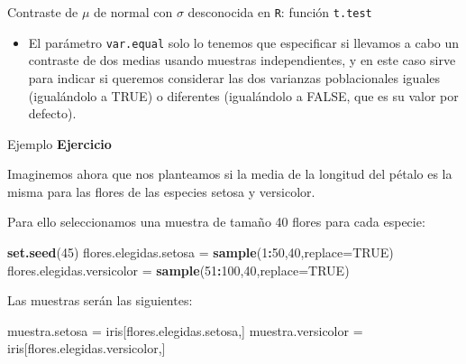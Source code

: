 \documentclass[
  ignorenonframetext,
]{beamer}
\newenvironment{Shaded}{\begin{snugshade}}{\end{snugshade}}
\newcommand{\DataTypeTok}[1]{\textcolor[rgb]{0.13,0.29,0.53}{#1}}
\newcommand{\DecValTok}[1]{\textcolor[rgb]{0.00,0.00,0.81}{#1}}
\newcommand{\KeywordTok}[1]{\textcolor[rgb]{0.13,0.29,0.53}{\textbf{#1}}}
\newcommand{\NormalTok}[1]{#1}
\newcommand{\OperatorTok}[1]{\textcolor[rgb]{0.81,0.36,0.00}{\textbf{#1}}}
\newcommand{\OtherTok}[1]{\textcolor[rgb]{0.56,0.35,0.01}{#1}}
\newcommand{\StringTok}[1]{\textcolor[rgb]{0.31,0.60,0.02}{#1}}
\providecommand{\tightlist}{%
  \setlength{\itemsep}{0pt}\setlength{\parskip}{0pt}}
\begin{document}
\begin{frame}[fragile]{Contraste de \(\mu\) de normal con \(\sigma\)
desconocida en \texttt{R}: función \texttt{t.test}}
\protect\hypertarget{contraste-de-mu-de-normal-con-sigma-desconocida-en-r-funciuxf3n-t.test-1}{}
\begin{itemize}
\tightlist
\item
  El parámetro \texttt{var.equal} solo lo tenemos que especificar si
  llevamos a cabo un contraste de dos medias usando muestras
  independientes, y en este caso sirve para indicar si queremos
  considerar las dos varianzas poblacionales iguales (igualándolo a
  TRUE) o diferentes (igualándolo a FALSE, que es su valor por defecto).
\end{itemize}
\end{frame}

\begin{frame}[fragile]{Ejemplo}
\protect\hypertarget{ejemplo-1}{}
\textbf{Ejercicio}

Imaginemos ahora que nos planteamos si la media de la longitud del
pétalo es la misma para las flores de las especies setosa y versicolor.

Para ello seleccionamos una muestra de tamaño 40 flores para cada
especie:

\begin{Shaded}
\begin{Highlighting}[]
\KeywordTok{set.seed}\NormalTok{(}\DecValTok{45}\NormalTok{)}
\NormalTok{flores.elegidas.setosa =}\StringTok{ }\KeywordTok{sample}\NormalTok{(}\DecValTok{1}\OperatorTok{:}\DecValTok{50}\NormalTok{,}\DecValTok{40}\NormalTok{,}\DataTypeTok{replace=}\OtherTok{TRUE}\NormalTok{)}
\NormalTok{flores.elegidas.versicolor =}\StringTok{ }\KeywordTok{sample}\NormalTok{(}\DecValTok{51}\OperatorTok{:}\DecValTok{100}\NormalTok{,}\DecValTok{40}\NormalTok{,}\DataTypeTok{replace=}\OtherTok{TRUE}\NormalTok{)}
\end{Highlighting}
\end{Shaded}

Las muestras serán las siguientes:

\begin{Shaded}
\begin{Highlighting}[]
\NormalTok{muestra.setosa =}\StringTok{ }\NormalTok{iris[flores.elegidas.setosa,]}
\NormalTok{muestra.versicolor =}\StringTok{ }\NormalTok{iris[flores.elegidas.versicolor,]}
\end{Highlighting}
\end{Shaded}
\end{frame}
\end{document}
